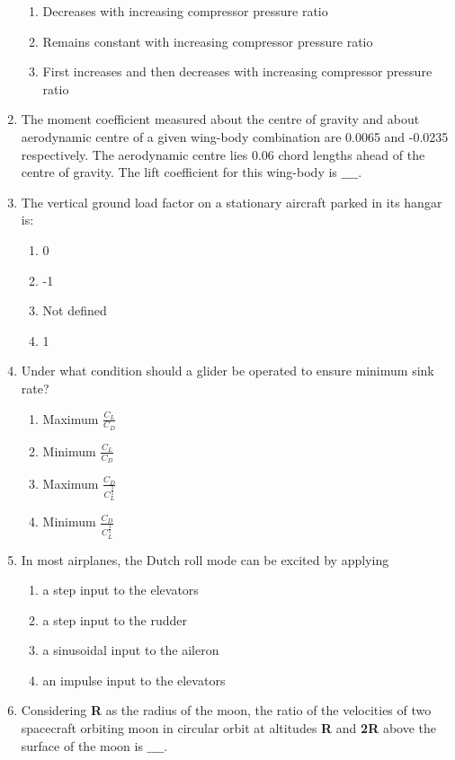 \documentclass[journal]{IEEEtran}
\begin{document}
\begin{enumerate}
\begin{enumerate}
     \item Decreases with increasing compressor pressure ratio
     \item Remains constant with increasing compressor pressure ratio
     \item First increases and then decreases with increasing compressor pressure ratio \\
 \end{enumerate}
\item The moment coefficient measured about the centre of gravity and about aerodynamic centre of a given wing-body combination are 0.0065 and -0.0235 respectively. The aerodynamic centre lies 0.06 chord lengths ahead of the centre of gravity. The lift coefficient for this wing-body is $\_\_\_\_$. \\
\item The vertical ground load factor on a stationary aircraft parked in its hangar is:
\begin{enumerate}
    \item 0
    \item -1
    \item Not defined
    \item 1 \\
\end{enumerate}
\item Under what condition should a glider be operated to ensure minimum sink rate?
\begin{enumerate}
    \item Maximum $\frac{C_L}{C_D}$
    \item Minimum $\frac{C_L}{C_D}$
    \item Maximum $\frac{C_D}{C_L^\frac{3}{2}}$
    \item Minimum $\frac{C_D}{C_L^\frac{3}{2}}$ \\
 \end{enumerate}
\item In most airplanes, the Dutch roll mode can be excited by applying
 \begin{enumerate}
    \item a step input to the elevators
    \item a step input to the rudder
    \item a sinusoidal input to the aileron
    \item an impulse input to the elevators \\
 \end{enumerate}
\item Considering \textbf{R} as the radius of the moon, the ratio of the velocities of two spacecraft orbiting moon in circular orbit at altitudes \textbf{R} and \textbf{2R} above the surface of the moon is $\_\_\_\_$. \\

\end{enumerate}
\end{document}
